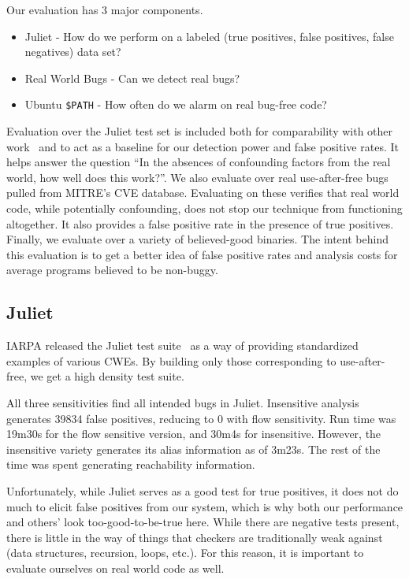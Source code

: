 Our evaluation has 3 major components.
\begin{itemize}
\item Juliet - How do we perform on a labeled (true positives, false positives, false negatives) data set?
\item Real World Bugs - Can we detect real bugs? 
\item Ubuntu \texttt{\$PATH} - How often do we alarm on real bug-free code?
\end{itemize}

Evaluation over the Juliet test set is included both for comparability with other work~\cite{tac, juliet-eval-static-source} and to act as a baseline for our detection power and false positive rates.
It helps answer the question ``In the absences of confounding factors from the real world, how well does this work?''.
We also evaluate over real use-after-free bugs pulled from MITRE's CVE database.
Evaluating on these verifies that real world code, while potentially confounding, does not stop our technique from functioning altogether.
It also provides a false positive rate in the presence of true positives.
Finally, we evaluate over a variety of believed-good binaries.
The intent behind this evaluation is to get a better idea of false positive rates and analysis costs for average programs believed to be non-buggy.

\subsection{Juliet}
IARPA released the Juliet test suite~\cite{juliet} as a way of providing standardized examples of various CWEs.
By building only those corresponding to use-after-free, we get a high density test suite.

All three sensitivities find all intended bugs in Juliet.
Insensitive analysis generates 39834 false positives, reducing to 0 with flow sensitivity.
Run time was 19m30s for the flow sensitive version, and 30m4s for insensitive.
However, the insensitive variety generates its alias information as of 3m23s.
The rest of the time was spent generating reachability information.

Unfortunately, while Juliet serves as a good test for true positives, it does not do much to elicit false positives from our system, which is why both our performance and others' look too-good-to-be-true here.
While there are negative tests present, there is little in the way of things that checkers are traditionally weak against (data structures, recursion, loops, etc.).
For this reason, it is important to evaluate ourselves on real world code as well.

